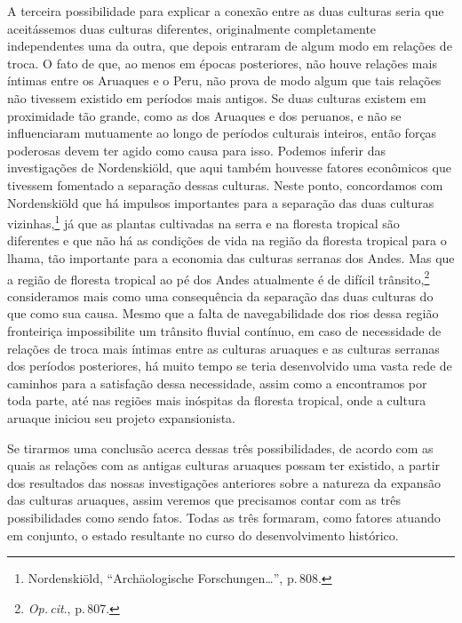 A terceira possibilidade para explicar a conexão entre as duas culturas
seria que aceitássemos duas culturas diferentes, originalmente
completamente independentes uma da outra, que depois entraram de algum
modo em relações de troca. O fato de que, ao menos em épocas
posteriores, não houve relações mais íntimas entre os Aruaques e o Peru,
não prova de modo algum que tais relações não tivessem existido em
períodos mais antigos. Se duas culturas existem em proximidade tão
grande, como as dos Aruaques e dos peruanos, e não se influenciaram
mutuamente ao longo de períodos culturais inteiros, então forças
poderosas devem ter agido como causa para isso. Podemos inferir das
investigações de Nordenskiöld, que aqui também houvesse fatores
econômicos que tivessem fomentado a separação dessas culturas. Neste
ponto, concordamos com Nordenskiöld que há impulsos importantes para a
separação das duas culturas vizinhas,\footnote{Nordenskiöld,
  ``Archäologische Forschungen\ldots'', p.\,808.} 
  já que as plantas cultivadas na serra e na floresta tropical
são diferentes e que não há as condições de vida na região da floresta
tropical para o lhama, tão importante para a economia das culturas
serranas dos Andes. Mas que a região de floresta tropical ao pé dos
Andes atualmente é de difícil trânsito,\footnote{\textit{Op.\,cit}., p.\,807.}
consideramos mais como uma consequência da separação das duas culturas
do que como sua causa. Mesmo que a falta de navegabilidade dos rios
dessa região fronteiriça impossibilite um trânsito fluvial contínuo, em
caso de necessidade de relações de troca mais íntimas entre as culturas
aruaques e as culturas serranas dos períodos posteriores, há muito tempo
se teria desenvolvido uma vasta rede de caminhos para a satisfação dessa
necessidade, assim como a encontramos por toda parte, até nas regiões
mais inóspitas da floresta tropical, onde a cultura aruaque iniciou seu
projeto expansionista.

Se tirarmos uma conclusão acerca dessas três possibilidades, de acordo
com as quais as relações com as antigas culturas aruaques possam ter
existido, a partir dos resultados das nossas investigações anteriores
sobre a natureza da expansão das culturas aruaques, assim veremos que
precisamos contar com as três possibilidades como sendo fatos. Todas as
três formaram, como fatores atuando em conjunto, o estado resultante no
curso do desenvolvimento histórico.

